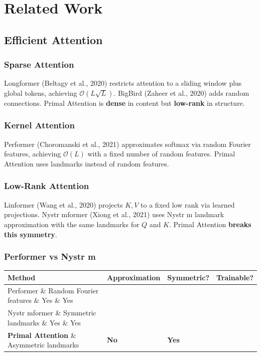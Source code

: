 
\section{Related Work}

\subsection{Efficient Attention}

\subsubsection{Sparse Attention}

Longformer (Beltagy et al., 2020) restricts attention to a sliding window 
plus global tokens, achieving $\mathcal{O}(L \sqrt{L})$. BigBird (Zaheer et 
al., 2020) adds random connections. Primal Attention is \textbf{dense} in content 
but \textbf{low-rank} in structure.

\subsubsection{Kernel Attention}

Performer (Choromanski et al., 2021) approximates softmax via random Fourier 
features, achieving $\mathcal{O}(L)$ with a fixed number of random features. 
Primal Attention uses landmarks instead of random features.

\subsubsection{Low-Rank Attention}

Linformer (Wang et al., 2020) projects $K, V$ to a fixed low rank via learned 
projections. Nystr mformer (Xiong et al., 2021) uses Nystr m landmark 
approximation with the same landmarks for $Q$ and $K$. Primal Attention 
\textbf{breaks this symmetry}.

\subsubsection{Performer vs Nystr m}

\begin{table}[H]
\centering
\small
\begin{tabular}{llll}
\toprule
\textbf{Method} & \textbf{Approximation} & \textbf{Symmetric?} & \textbf{Trainable?} \\
\midrule
Performer \& Random Fourier features \& Yes \& Yes \\
Nystr mformer \& Symmetric landmarks \& Yes \& Yes \\
\textbf{Primal Attention} \& Asymmetric landmarks & \textbf{No} & \textbf{Yes} \\
\bottomrule
\end{tabular}
\end{table}

